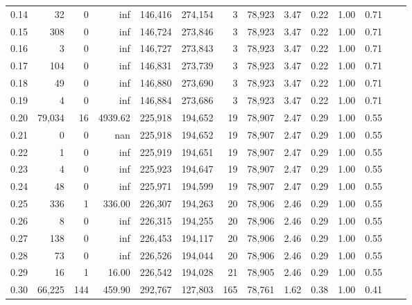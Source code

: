 \begin{tabular}{rrrrrrrrrrrrrr}
0.14 &      32 &       0 &       inf &  146,416 &  274,154 &       3 &  78,923 &  3.47 &  0.22 &  1.00 &      0.71 \\
0.15 &     308 &       0 &       inf &  146,724 &  273,846 &       3 &  78,923 &  3.47 &  0.22 &  1.00 &      0.71 \\
0.16 &       3 &       0 &       inf &  146,727 &  273,843 &       3 &  78,923 &  3.47 &  0.22 &  1.00 &      0.71 \\
0.17 &     104 &       0 &       inf &  146,831 &  273,739 &       3 &  78,923 &  3.47 &  0.22 &  1.00 &      0.71 \\
0.18 &      49 &       0 &       inf &  146,880 &  273,690 &       3 &  78,923 &  3.47 &  0.22 &  1.00 &      0.71 \\
0.19 &       4 &       0 &       inf &  146,884 &  273,686 &       3 &  78,923 &  3.47 &  0.22 &  1.00 &      0.71 \\
0.20 &  79,034 &      16 &   4939.62 &  225,918 &  194,652 &      19 &  78,907 &  2.47 &  0.29 &  1.00 &      0.55 \\
0.21 &       0 &       0 &       nan &  225,918 &  194,652 &      19 &  78,907 &  2.47 &  0.29 &  1.00 &      0.55 \\
0.22 &       1 &       0 &       inf &  225,919 &  194,651 &      19 &  78,907 &  2.47 &  0.29 &  1.00 &      0.55 \\
0.23 &       4 &       0 &       inf &  225,923 &  194,647 &      19 &  78,907 &  2.47 &  0.29 &  1.00 &      0.55 \\
0.24 &      48 &       0 &       inf &  225,971 &  194,599 &      19 &  78,907 &  2.47 &  0.29 &  1.00 &      0.55 \\
0.25 &     336 &       1 &    336.00 &  226,307 &  194,263 &      20 &  78,906 &  2.46 &  0.29 &  1.00 &      0.55 \\
0.26 &       8 &       0 &       inf &  226,315 &  194,255 &      20 &  78,906 &  2.46 &  0.29 &  1.00 &      0.55 \\
0.27 &     138 &       0 &       inf &  226,453 &  194,117 &      20 &  78,906 &  2.46 &  0.29 &  1.00 &      0.55 \\
0.28 &      73 &       0 &       inf &  226,526 &  194,044 &      20 &  78,906 &  2.46 &  0.29 &  1.00 &      0.55 \\
0.29 &      16 &       1 &     16.00 &  226,542 &  194,028 &      21 &  78,905 &  2.46 &  0.29 &  1.00 &      0.55 \\
0.30 &  66,225 &     144 &    459.90 &  292,767 &  127,803 &     165 &  78,761 &  1.62 &  0.38 &  1.00 &      0.41 \\

\end{tabular}
